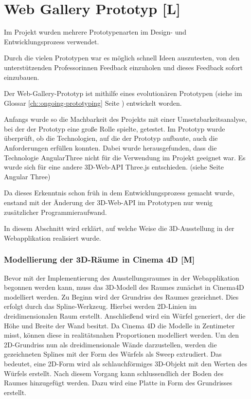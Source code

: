 \section{Web Gallery Prototyp [L]}
Im Projekt wurden mehrere Prototypenarten im Design- und Entwicklungsprozess verwendet.


Durch die vielen Prototypen war es möglich schnell Ideen auszutesten, von den unterstützenden Professorinnen Feedback einzuholen und dieses Feedback sofort einzubauen.


Der Web-Gallery-Prototyp ist mithilfe eines evolutionären Prototypen (siehe im Glossar \ref{ch::ongoing-prototyping} Seite \pageref{ch::ongoing-prototyping}) entwickelt worden.


Anfangs wurde so die Machbarkeit des Projekts mit einer Umsetzbarkeitsanalyse, bei der der Prototyp eine große Rolle spielte, getestet. Im Prototyp wurde überprüft, ob die Technologien, auf die der Prototyp aufbaute, auch die Anforderungen erfüllen konnten. Dabei wurde herausgefunden, dass die Technologie AngularThree nicht für die Verwendung im Projekt geeignet war. Es wurde sich für eine andere 3D-Web-API Three.js entschieden. (siehe Seite \pageref{ch:Technologien:AngularThree} Angular Three)


Da dieses Erkenntnis schon früh in dem Entwicklungsprozess gemacht wurde, enstand mit der Änderung der 3D-Web-API im Prototypen nur wenig zusätzlicher Programmieraufwand.


In diesem Abschnitt wird erklärt, auf welche Weise die 3D-Ausstellung in der Webapplikation realisiert wurde.

\subsubsection{Modellierung der 3D-Räume in Cinema 4D [M]}
Bevor mit der Implementierung des Ausstellungsraumes in der Webapplikation begonnen werden kann, muss das 3D-Modell des Raumes zunächst in Cinema4D modelliert werden. Zu Beginn wird der Grundriss des Raumes gezeichnet. Dies erfolgt durch das Spline-Werkzeug. Hierbei werden 2D-Linien im dreidimensionalen Raum erstellt. Anschließend wird ein Würfel generiert, der die Höhe und Breite der Wand besitzt. Da Cinema 4D die Modelle in Zentimeter misst, können diese in realitätsnahen Proportionen modelliert werden. Um den 2D-Grundriss nun als dreidimensionale Wände darzustellen, werden die gezeichneten Splines mit der Form des Würfels als Sweep extrudiert. Das bedeutet, eine 2D-Form wird als schlauchförmiges 3D-Objekt mit den Werten des Würfels erstellt. Nach diesem Vorgang kann schlussendlich der Boden des Raumes hinzugefügt werden. Dazu wird eine Platte in Form des Grundrisses erstellt. 


